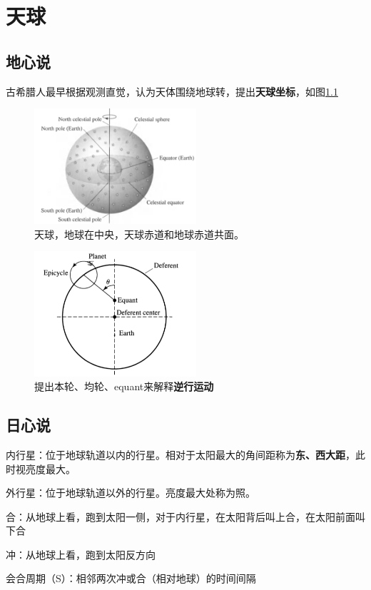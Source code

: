 \chapter{天球}
\section{地心说}
古希腊人最早根据观测直觉，认为天体围绕地球转，提出{\bf 天球坐标}，如图\ref{fig:celestialsphere}
\begin{figure}[hbt]
	\centering
	\includegraphics[width=6cm]{chapters/01/celestialsphere}
	\caption{天球，地球在中央，天球赤道和地球赤道共面。}
	\label{fig:celestialsphere}
\end{figure}


\begin{figure}[hbt]
  \centering
  \includegraphics[width=6cm]{chapters/01/ptolemaicmodel}
  \caption{提出本轮、均轮、equant来解释{\bf 逆行运动}	}
  \label{fig:ptolemarcmodel}
\end{figure}

\section{日心说}
内行星：位于地球轨道以内的行星。相对于太阳最大的角间距称为{\bf 东、西大距}，此时视亮度最大。

外行星：位于地球轨道以外的行星。亮度最大处称为照。

合：从地球上看，跑到太阳一侧，对于内行星，在太阳背后叫上合，在太阳前面叫下合

冲：从地球上看，跑到太阳反方向

会合周期（S）：相邻两次冲或合（相对地球）的时间间隔

